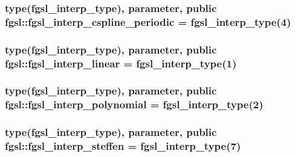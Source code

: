 \subsubsection[{fgsl\+\_\+interp\+\_\+cspline\+\_\+periodic}]{\setlength{\rightskip}{0pt plus 5cm}type({\bf fgsl\+\_\+interp\+\_\+type}), parameter, public fgsl\+::fgsl\+\_\+interp\+\_\+cspline\+\_\+periodic = {\bf fgsl\+\_\+interp\+\_\+type}(4)}\label{namespacefgsl_a383cf4d39acd2faf1d29a204d9349043}
\hypertarget{namespacefgsl_a56a303cdb0b7046c3d8bfd1ebbf77bbc}{}
\subsubsection[{fgsl\+\_\+interp\+\_\+linear}]{\setlength{\rightskip}{0pt plus 5cm}type({\bf fgsl\+\_\+interp\+\_\+type}), parameter, public fgsl\+::fgsl\+\_\+interp\+\_\+linear = {\bf fgsl\+\_\+interp\+\_\+type}(1)}\label{namespacefgsl_a56a303cdb0b7046c3d8bfd1ebbf77bbc}
\hypertarget{namespacefgsl_aedbdc4347cb86cafe5bd0a2da8e38648}{}
\subsubsection[{fgsl\+\_\+interp\+\_\+polynomial}]{\setlength{\rightskip}{0pt plus 5cm}type({\bf fgsl\+\_\+interp\+\_\+type}), parameter, public fgsl\+::fgsl\+\_\+interp\+\_\+polynomial = {\bf fgsl\+\_\+interp\+\_\+type}(2)}\label{namespacefgsl_aedbdc4347cb86cafe5bd0a2da8e38648}
\hypertarget{namespacefgsl_ae9546a0778cace93ab276425caea840b}{}
\subsubsection[{fgsl\+\_\+interp\+\_\+steffen}]{\setlength{\rightskip}{0pt plus 5cm}type({\bf fgsl\+\_\+interp\+\_\+type}), parameter, public fgsl\+::fgsl\+\_\+interp\+\_\+steffen = {\bf fgsl\+\_\+interp\+\_\+type}(7)}\label{namespacefgsl_ae9546a0778cace93ab276425caea840b}
\hypertarget{namespacefgsl_a22fca1111887118eb07d5f9688ea38ad}{}
